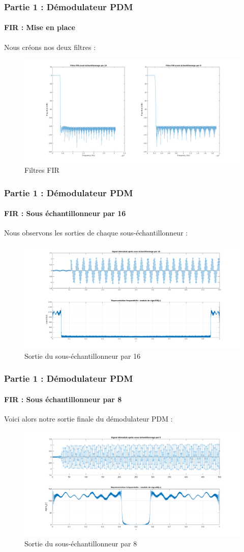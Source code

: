 \documentclass[
10pt,
aspectratio=169,
]{beamer}
\begin{document}
\begin{frame}
\frametitle{Partie 1 : Démodulateur PDM} 
\framesubtitle{FIR : Mise en place} 
Nous créons nos deux filtres : 
\begin{figure}[h]
    \centering
    \includegraphics[scale=0.2]{Images/FIR.png}
    \caption{Filtres FIR}
\end{figure}
\end{frame}

\begin{frame}
\frametitle{Partie 1 : Démodulateur PDM} 
\framesubtitle{FIR : Sous échantillonneur par 16}  
Nous observons les sorties de chaque sous-échantillonneur : 
\begin{figure}[h]
    \centering
    \includegraphics[scale=0.2]{Images/signal16.png}
    \caption{Sortie du sous-échantillonneur par 16}
\end{figure}
\end{frame}

\begin{frame}
\frametitle{Partie 1 : Démodulateur PDM} 
\framesubtitle{FIR : Sous échantillonneur par 8} 
Voici alors notre sortie finale du démodulateur PDM : 
\begin{figure}[h]
    \centering
    \includegraphics[scale=0.2]{Images/signal8.png}
    \caption{Sortie du sous-échantillonneur par 8}
\end{figure}
\end{frame}
\end{document}
